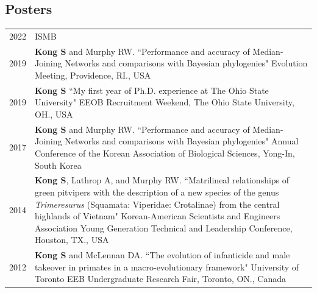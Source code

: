 \documentclass[11pt]{article}
\begin{document}
\subsection*{Posters}
\begin{longtable}{p{}  p{}}
2022 & ISMB \color{red}{$>>>$Coming soon!}\vspace{5pt} \\ 

2019 & \textbf{Kong S} and Murphy RW. ``Performance and accuracy of Median-Joining Networks and comparisons with Bayesian phylogenies" Evolution Meeting, Providence, RI., USA \vspace{5pt} \\ 
2019 &  \textbf{Kong S} ``My first year of Ph.D. experience at The Ohio State University" EEOB Recruitment Weekend,  The Ohio State University, OH., USA\vspace{5pt} \\ 
2017 & \textbf{Kong S} and Murphy RW. ``Performance and accuracy of Median-Joining Networks and comparisons with Bayesian phylogenies"  Annual Conference of the Korean Association of Biological Sciences, Yong-In, South Korea\vspace{5pt} \\ 
2014 & \textbf{Kong S}, Lathrop A, and Murphy RW. ``Matrilineal relationships of green pitvipers with the description of a new species of the genus \textit{Trimeresurus} (Squamata: Viperidae: Crotalinae) from the central highlands of Vietnam" Korean-American Scientists and Engineers Association Young Generation Technical and Leadership Conference, Houston, TX., USA\vspace{5pt} \\ 
2012 & \textbf{Kong S} and McLennan DA. ``The evolution of infanticide and male takeover in primates in a macro-evolutionary framework" University of Toronto EEB Undergraduate Research Fair, Toronto, ON., Canada\vspace{5pt}\\
\end{longtable}
\end{document}

